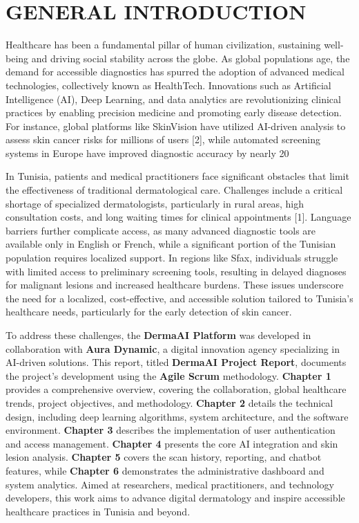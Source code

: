 \clearpage
\chapter*{GENERAL INTRODUCTION}

Healthcare has been a fundamental pillar of human civilization, sustaining well-being and driving social stability across the globe. As global populations age, the demand for accessible diagnostics has spurred the adoption of advanced medical technologies, collectively known as HealthTech. Innovations such as Artificial Intelligence (AI), Deep Learning, and data analytics are revolutionizing clinical practices by enabling precision medicine and promoting early disease detection. For instance, global platforms like SkinVision have utilized AI-driven analysis to assess skin cancer risks for millions of users [2], while automated screening systems in Europe have improved diagnostic accuracy by nearly 20%

In Tunisia, patients and medical practitioners face significant obstacles that limit the effectiveness of traditional dermatological care. Challenges include a critical shortage of specialized dermatologists, particularly in rural areas, high consultation costs, and long waiting times for clinical appointments [1]. Language barriers further complicate access, as many advanced diagnostic tools are available only in English or French, while a significant portion of the Tunisian population requires localized support. In regions like Sfax, individuals struggle with limited access to preliminary screening tools, resulting in delayed diagnoses for malignant lesions and increased healthcare burdens. These issues underscore the need for a localized, cost-effective, and accessible solution tailored to Tunisia’s healthcare needs, particularly for the early detection of skin cancer.

To address these challenges, the \textbf{DermaAI Platform} was developed in collaboration with \textbf{Aura Dynamic}, a digital innovation agency specializing in AI-driven solutions. This report, titled \textbf{DermaAI Project Report}, documents the project’s development using the \textbf{Agile Scrum} methodology. \textbf{Chapter 1} provides a comprehensive overview, covering the collaboration, global healthcare trends, project objectives, and methodology. \textbf{Chapter 2} details the technical design, including deep learning algorithms, system architecture, and the software environment. \textbf{Chapter 3} describes the implementation of user authentication and access management. \textbf{Chapter 4} presents the core AI integration and skin lesion analysis. \textbf{Chapter 5} covers the scan history, reporting, and chatbot features, while \textbf{Chapter 6} demonstrates the administrative dashboard and system analytics. Aimed at researchers, medical practitioners, and technology developers, this work aims to advance digital dermatology and inspire accessible healthcare practices in Tunisia and beyond.
\newpage
